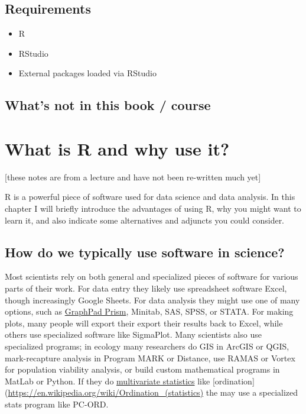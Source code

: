 \documentclass[
]{book}
\providecommand{\tightlist}{%
  \setlength{\itemsep}{0pt}\setlength{\parskip}{0pt}}
\begin{document}
\hypertarget{requirements}{%
\section{Requirements}\label{requirements}}

\begin{itemize}
\tightlist
\item
  R
\item
  RStudio
\item
  External packages loaded via RStudio
\end{itemize}

\hypertarget{whats-not-in-this-book-course}{%
\section{What's not in this book / course}\label{whats-not-in-this-book-course}}

\hypertarget{what-is-r-and-why-use-it}{%
\chapter{What is R and why use it?}\label{what-is-r-and-why-use-it}}

{[}these notes are from a lecture and have not been re-written much yet{]}

R is a powerful piece of software used for data science and data analysis. In this chapter I will briefly introduce the advantages of using R, why you might want to learn it, and also indicate some alternatives and adjuncts you could consider.

\hypertarget{how-do-we-typically-use-software-in-science}{%
\section{How do we typically use software in science?}\label{how-do-we-typically-use-software-in-science}}

Most scientists rely on both general and specialized pieces of software for various parts of their work. For data entry they likely use spreadsheet software Excel, though increasingly Google Sheets. For data analysis they might use one of many options, such as \href{https://www.graphpad.com/}{GraphPad Prism}, Minitab, SAS, SPSS, or STATA. For making plots, many people will export their export their results back to Excel, while others use specialized software like SigmaPlot. Many scientists also use specialized programs; in ecology many researchers do GIS in ArcGIS or QGIS, mark-recapture analysis in Program MARK or Distance, use RAMAS or Vortex for population viability analysis, or build custom mathematical programs in MatLab or Python. If they do \href{https://en.wikipedia.org/wiki/Multivariate_statistics}{multivariate statistics} like {[}ordination{]}(\url{https://en.wikipedia.org/wiki/Ordination_(statistics)} the may use a specialized stats program like PC-ORD.
\end{document}
